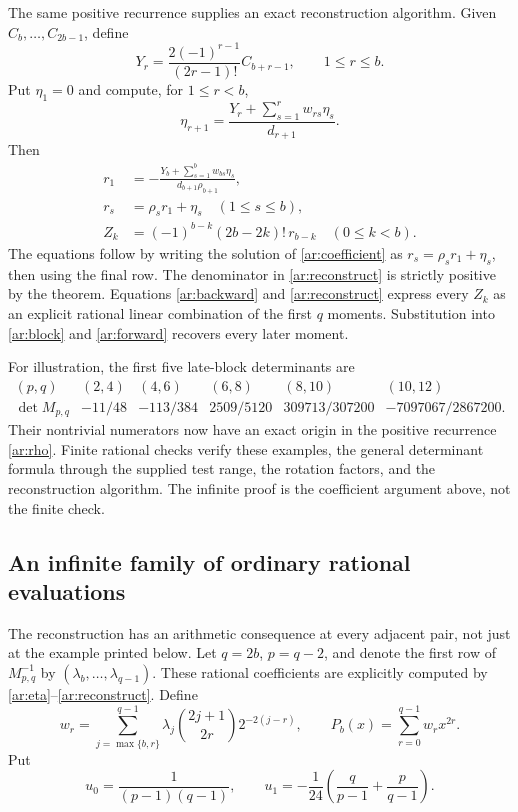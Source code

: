 The same positive recurrence supplies an exact reconstruction algorithm.
Given $C_b,\ldots,C_{2b-1}$, define
\[
            Y_r=\frac{2(-1)^{r-1}}{(2r-1)!}C_{b+r-1},
                       \qquad 1\le r\le b.
\]
Put $\eta_1=0$ and compute, for $1\le r<b$,
\begin{equation}\label{ar:eta}
       \eta_{r+1}=\frac{Y_r+\sum_{s=1}^rw_{rs}\eta_s}{d_{r+1}}.
\end{equation}
Then
\begin{equation}\label{ar:reconstruct}
 \begin{split}
 r_1&=-\frac{Y_b+\sum_{s=1}^bw_{bs}\eta_s}
                  {d_{b+1}\rho_{b+1}},\\
 r_s&=\rho_sr_1+\eta_s\quad(1\le s\le b),\\
 Z_k&=(-1)^{b-k}(2b-2k)!\,r_{b-k}\quad(0\le k<b).
 \end{split}
\end{equation}
The equations follow by writing the solution of
\eqref{ar:coefficient} as $r_s=\rho_sr_1+\eta_s$, then using
the final row. The denominator in \eqref{ar:reconstruct} is strictly
positive by the theorem. Equations \eqref{ar:backward} and
\eqref{ar:reconstruct} express every $Z_k$ as an explicit rational
linear combination of the first $q$ moments. Substitution into
\eqref{ar:block} and \eqref{ar:forward} recovers every later moment.

For illustration, the first five late-block determinants are
\[
 \begin{array}{c|ccccc}
 (p,q)&(2,4)&(4,6)&(6,8)&(8,10)&(10,12)\\\hline
 \det M_{p,q}&-11/48&-113/384&2509/5120&309713/307200&-7097067/2867200.
 \end{array}
\]
Their nontrivial numerators now have an exact origin in the positive
recurrence \eqref{ar:rho}. Finite rational checks verify these examples,
the general determinant formula through the supplied test range, the
rotation factors, and the reconstruction algorithm. The infinite proof
is the coefficient argument above, not the finite check.

\subsection{An infinite family of ordinary rational evaluations}

The reconstruction has an arithmetic consequence at every adjacent pair,
not just at the example printed below. Let $q=2b$, $p=q-2$, and denote
the first row of $M_{p,q}^{-1}$ by $(\lambda_b,\ldots,\lambda_{q-1})$.
These rational coefficients are explicitly computed by
\eqref{ar:eta}--\eqref{ar:reconstruct}. Define
\begin{equation}\label{ar:all-weights}
 w_r=\sum_{j=\max\{b,r\}}^{q-1}
     \lambda_j\binom{2j+1}{2r}2^{-2(j-r)},\qquad
 P_b(x)=\sum_{r=0}^{q-1}w_rx^{2r}.
\end{equation}
Put
\[
 u_0=\frac1{(p-1)(q-1)},\qquad
 u_1=-\frac1{24}\left(\frac q{p-1}+\frac p{q-1}\right).
\]

